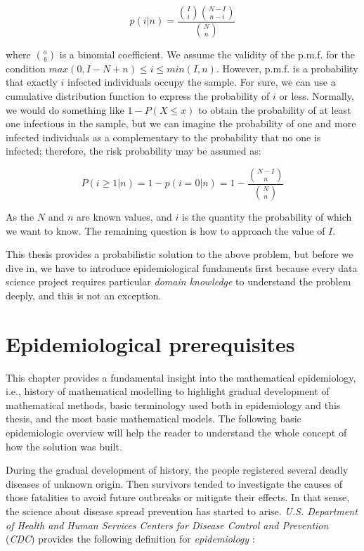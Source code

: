\documentclass[
  digital, %
  oneside, %
  lof,     %
  lot,     %
]{fithesis4}
\begin{document}
\begin{equation}
  p(i|n) = \frac{ \binom{I}{i} \binom{N - I}{n - i} }{ \binom{N}{n} }
\end{equation}

where $\binom{a}{b}$ is a binomial coefficient.
We assume the validity of the p.m.f. for the condition $max\left( 0, I - N + n \right) \leq i \leq min\left( I, n \right)$.
However, p.m.f. is a probability that exactly $i$ infected individuals occupy the sample.
For sure, we can use a cumulative distribution function to express the probability of $i$ or less.
Normally, we would do something like $1 - P(X \leq x)$ to obtain the probability of at least one infectious in the sample, but we can imagine the probability of one and more infected individuals as a complementary to the probability that no one is infected; therefore, the risk  probability may be assumed as:

\begin{equation}\label{eq:risk-theoretic}
  P(i \geq 1|n) = 1 - p(i=0|n) = 1 - \frac{
    \binom{N - I}{n}
  }{
    \binom{N}{n}
  }
\end{equation}

As the $N$ and $n$ are known values, and $i$ is the quantity the probability of which we want to know.
The remaining question is how to approach the value of $I$.

This thesis provides a probabilistic solution to the above problem, but before we dive in, we have to introduce epidemiological fundaments first because every data science project requires particular \textit{domain knowledge} to understand the problem deeply, and this is not an exception.


\chapter{Epidemiological prerequisites}
\label{chap:epidemiological-prerequisites}

This chapter provides a fundamental insight into the mathematical epidemiology, i.e., history of mathematical modelling to highlight gradual development of mathematical methods, basic terminology used both in epidemiology and this thesis, and the most basic mathematical models.
The following basic epidemiologic overview will help the reader to understand the whole concept of how the solution was built.

During the gradual development of history, the people registered several deadly diseases of unknown origin.
Then survivors tended to investigate the causes of those fatalities to avoid future outbreaks or mitigate their effects.
In that sense, the science about disease spread prevention has started to arise.
\textit{U.S. Department of Health and Human Services Centers for Disease Control and Prevention} (\textit{CDC}) provides the following definition for \textit{epidemiology} \cite{cdc2006}:
\end{document}
